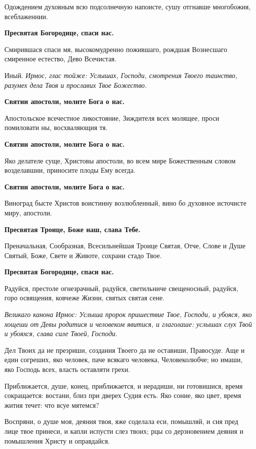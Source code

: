 Одождением духовным всю подсолнечную напоисте, сушу отгнавше многобожия, всеблаженнии.


\bfseries Пресвятая Богородице, спаси нас.\normalfont{}


Смирившася спаси мя, высокомудренно пожившаго, рождшая Вознесшаго смиренное естество, Дево Всечистая.


Иный. \itshape Ирмос\normalfont{}, глас тойже: Услышах, Господи, смотрения Твоего таинство, разумех дела Твоя и прославих Твое Божество.


\bfseries Святии апостоли, молите Бога о нас.\normalfont{}


Апостольское всечестное ликостояние, Зиждителя всех молящее, проси помиловати ны, восхваляющия тя.


\bfseries Святии апостоли, молите Бога о нас.\normalfont{}


Яко делателе суще, Христовы апостоли, во всем мире Божественным словом возделавшии, приносите плоды Ему всегда.


\bfseries Святии апостоли, молите Бога о нас.\normalfont{}


Виноград бысте Христов воистинну возлюбленный, вино бо духовное источисте миру, апостоли.


\bfseries Пресвятая Троице, Боже наш, слава Тебе.\normalfont{}


Преначальная, Сообразная, Всесильнейшая Троице Святая, Отче, Слове и Душе Святый, Боже, Свете и Животе, сохрани стадо Твое.


\bfseries Пресвятая Богородице, спаси нас.\normalfont{}


Радуйся, престоле огнезрачный, радуйся, светильниче свещеносный, радуйся, горо освящения, ковчеже Жизни, святых святая сене.


\itshape Великаго канона Ирмос\normalfont{}: Услыша пророк пришествие Твое, Господи, и убояся, яко хощеши от Девы родитися и человеком явитися, и глаголаше: услышах слух Твой и убояхся, слава силе Твоей, Господи.


Дел Твоих да не презриши, создания Твоего да не оставиши, Правосуде. Аще и един согреших, яко человек, паче всякаго человека, Человеколюбче; но имаши, яко Господь всех, власть оставляти грехи.


Приближается, душе, конец, приближается, и нерадиши, ни готовишися, время сокращается: востани, близ при дверех Судия есть. Яко соние, яко цвет, время жития течет: что всуе мятемся?


Воспряни, о душе моя, деяния твоя, яже соделала еси, помышляй, и сия пред лице твое принеси, и капли испусти слез твоих; рцы со дерзновением деяния и помышления Христу и оправдайся.


